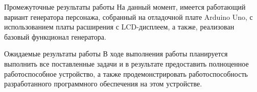 \documentclass[12pt,a4paper,mathserif]{beamer}
\begin{document}
\begin{frame}{Промежуточные результаты работы}
    \setlength{\parindent}{0.5cm}
    На данный момент, имеется работающий вариант генератора персонажа, собранный на отладочной плате Arduino Uno, с использованием платы расширения с LCD-дисплеем, а также, реализован базовый функционал генератора.
\end{frame}

\begin{frame}{Ожидаемые результаты работы}
    \setlength{\parindent}{0.5cm}
    В ходе выполнения работы планируется выполнить все поставленные задачи и в результате предоставить полноценное работоспособное устройство, а также продемонстрировать работоспособность разработанного программного обеспечения на этом устройстве.
\end{frame}
\end{document}
